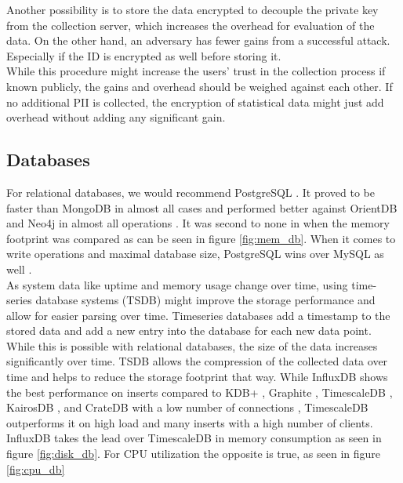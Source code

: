         Another possibility is to store the data encrypted to decouple the private key from the collection server, which increases the overhead for evaluation of the data. On the other hand, an adversary has fewer gains from a successful attack. Especially if the ID is encrypted as well before storing it.\\
        While this procedure might increase the users' trust in the collection process if known publicly, the gains and overhead should be weighed against each other. If no additional PII is collected, the encryption of statistical data might just add overhead without adding any significant gain.
        
\newpage
    \subsection{Databases} 
        \label{subsec:database}
        For relational databases, we would recommend PostgreSQL \cite{group_postgresql_2021}.
        It proved to be faster than MongoDB \cite{makris_mongodb_2020} in almost all cases and performed better against OrientDB and Neo4j in almost all operations \cite{noauthor_benchmark_2018}. It was second to none in  \cite{noauthor_benchmark_2018} when the memory footprint was compared as can be seen in figure \ref{fig:mem_db}.
        When it comes to write operations and maximal database size, PostgreSQL wins over MySQL as well \cite{noauthor_mysql_2021}.\\
        As system data like uptime and memory usage change over time, using time-series database systems (TSDB) might improve the storage performance and allow for easier parsing over time. Timeseries databases add a timestamp to the stored data and add a new entry into the database for each new data point. While this is possible with relational databases, the size of the data increases significantly over time. TSDB allows the compression of the collected data over time and helps to reduce the storage footprint that way. While InfluxDB shows the best performance on inserts compared to KDB+ \cite{noauthor_kdb_nodate}, Graphite \cite{noauthor_graphite_nodate}, TimescaleDB \cite{noauthor_time-series_nodate}, KairosDB \cite{noauthor_kairosdb_nodate}, and CrateDB \cite{noauthor_cratedb_nodate} with a low number of connections \cite{sychev_closed_2020}, TimescaleDB outperforms it on high load and many inserts with a high number of clients. InfluxDB takes   the lead over TimescaleDB in memory consumption as seen in figure \ref{fig:disk_db}. For CPU utilization the opposite is true, as seen in figure \ref{fig:cpu_db} \cite{freedman_timescaledb_2020}\\

